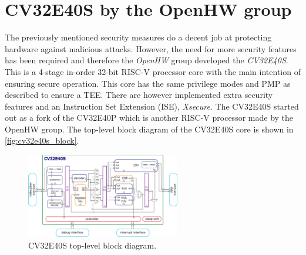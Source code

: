 \section{CV32E40S by the OpenHW group}
\label{sec:cv32}

The previously mentioned security measures do a decent job at protecting hardware against malicious attacks. However, the need for more security features has been required and therefore the \textit{OpenHW} group developed the \textit{CV32E40S}. This is a 4-stage in-order 32-bit RISC-V processor core with the main intention of ensuring secure operation\cite{cv32e40s_manual}. This core has the same privilege modes and PMP as described to ensure a TEE. There are however implemented extra security features and an Instruction Set Extension (ISE), \textit{Xsecure}. The CV32E40S started out as a fork of the CV32E40P which is another RISC-V processor made by the OpenHW group. The top-level block diagram of the CV32E40S core is shown in \autoref{fig:cv32e40s_block}.



\begin{figure}[h!]
    \centering
    \includegraphics[width=0.6\textwidth]{docs/images/CV32E40S_Block_Diagram.png}
    \caption{CV32E40S top-level block diagram\cite{cv32e40s_manual}.}
    \label{fig:cv32e40s_block}
\end{figure}

